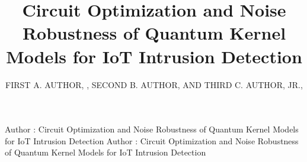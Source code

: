 \documentclass{ieeeaccess}
\begin{document}

\title{Circuit Optimization and Noise Robustness of Quantum Kernel Models for IoT Intrusion Detection}
\author{\uppercase{First A. Author}, ,
\uppercase{Second B. Author, and Third C. Author,
Jr}.,
}
\address[1]{National Institute of Standards and 
Technology, Boulder, CO 80305 USA (email: author@boulder.nist.gov)}
\address[2]{Department of Physics, Colorado State University, Fort Collins, 
CO 80523 USA (email: author@lamar.colostate.edu)}
\address[3]{Electrical Engineering Department, University of Colorado, Boulder, CO 
80309 USA}

\markboth
{Author \headeretal: Circuit Optimization and Noise Robustness of Quantum Kernel Models for IoT Intrusion Detection}
{Author \headeretal: Circuit Optimization and Noise Robustness of Quantum Kernel Models for IoT Intrusion Detection}

\end{document}
